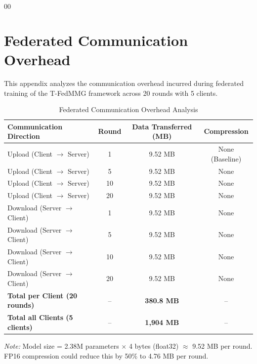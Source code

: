 \documentclass[12pt,a4paper]{report}
\begin{document}
{\begin{thebibliography}{00}
\end{thebibliography}


\appendix
{}

\chapter{Federated Communication Overhead}
\label{appendix:communication}

This appendix analyzes the communication overhead incurred during federated training of the T-FedMMG framework across 20 rounds with 5 clients.

\begin{table}[htbp]
\centering
\small
\caption{Federated Communication Overhead Analysis}
\label{tab:communication_overhead}
\begin{tabular}{lccc}
\toprule
\textbf{Communication Direction} & \textbf{Round} & \textbf{Data Transferred (MB)} & \textbf{Compression} \\
\midrule
Upload (Client $\rightarrow$ Server) & 1  & 9.52 MB & None (Baseline) \\
Upload (Client $\rightarrow$ Server) & 5  & 9.52 MB & None \\
Upload (Client $\rightarrow$ Server) & 10 & 9.52 MB & None \\
Upload (Client $\rightarrow$ Server) & 20 & 9.52 MB & None \\
\midrule
Download (Server $\rightarrow$ Client) & 1  & 9.52 MB & None \\
Download (Server $\rightarrow$ Client) & 5  & 9.52 MB & None \\
Download (Server $\rightarrow$ Client) & 10 & 9.52 MB & None \\
Download (Server $\rightarrow$ Client) & 20 & 9.52 MB & None \\
\midrule
\textbf{Total per Client (20 rounds)} & -- & \textbf{380.8 MB} & -- \\
\textbf{Total all Clients (5 clients)} & -- & \textbf{1,904 MB} & -- \\
\bottomrule
\end{tabular}
\end{table}

\vspace{0.5em}
\textit{Note:} Model size = 2.38M parameters $\times$ 4 bytes (float32) $\approx$ 9.52 MB per round. FP16 compression could reduce this by 50\% to 4.76 MB per round.

}
\end{document}
